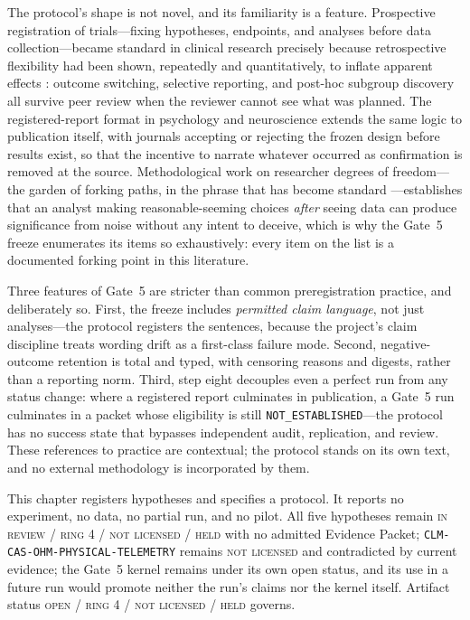 The protocol's shape is not novel, and its familiarity is a feature. Prospective registration of trials---fixing hypotheses, endpoints, and analyses before data collection---became standard in clinical research precisely because retrospective flexibility had been shown, repeatedly and quantitatively, to inflate apparent effects \cite{deangelis2004,simmons2011}: outcome switching, selective reporting, and post-hoc subgroup discovery all survive peer review when the reviewer cannot see what was planned. The registered-report format in psychology and neuroscience \cite{chambers2013} extends the same logic to publication itself, with journals accepting or rejecting the frozen design before results exist, so that the incentive to narrate whatever occurred as confirmation is removed at the source. Methodological work on researcher degrees of freedom---the garden of forking paths, in the phrase that has become standard \cite{gelmanloken}---establishes that an analyst making reasonable-seeming choices \emph{after} seeing data can produce significance from noise without any intent to deceive, which is why the Gate~5 freeze enumerates its items so exhaustively: every item on the list is a documented forking point in this literature.

Three features of Gate~5 are stricter than common preregistration practice, and deliberately so. First, the freeze includes \emph{permitted claim language}, not just analyses---the protocol registers the sentences, because the project's claim discipline treats wording drift as a first-class failure mode. Second, negative-outcome retention is total and typed, with censoring reasons and digests, rather than a reporting norm. Third, step eight decouples even a perfect run from any status change: where a registered report culminates in publication, a Gate~5 run culminates in a packet whose eligibility is still \texttt{NOT\_ESTABLISHED}---the protocol has no success state that bypasses independent audit, replication, and review. These references to practice are contextual; the protocol stands on its own text, and no external methodology is incorporated by them.

\begin{boundary}\label{hyp:bound:chapter}
This chapter registers hypotheses and specifies a protocol. It reports no experiment, no data, no partial run, and no pilot. All five hypotheses remain \textsc{in review / ring 4 / not licensed / held} with no admitted Evidence Packet; \texttt{CLM-CAS-OHM-PHYSICAL-TELEMETRY} remains \textsc{not licensed} and contradicted by current evidence; the Gate~5 kernel remains under its own open status, and its use in a future run would promote neither the run's claims nor the kernel itself. Artifact status \textsc{open / ring 4 / not licensed / held} governs.
\end{boundary}
